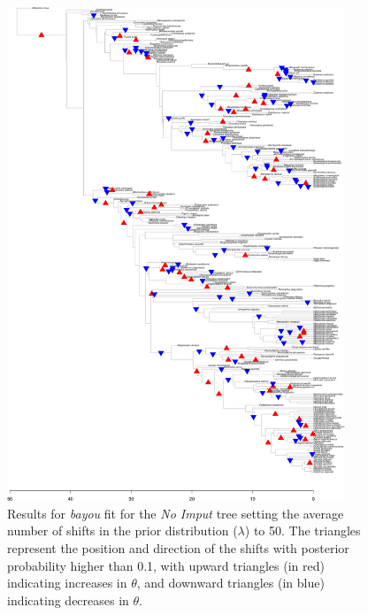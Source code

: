 \begin{figure}[H]
\includegraphics[width=0.9\textwidth]{img/plots-noimput-wZBL-k50-1.pdf}
\caption{Results for \textit{bayou} fit for the \textit{No Imput} tree setting the average number of shifts in the prior distribution ($\lambda$) to 50. The triangles represent the position and direction of the shifts with posterior probability higher than 0.1, with upward triangles (in red) indicating increases in $\theta$, and downward triangles (in blue) indicating decreases in $\theta$.}
\label{fig:noimput-k50}
\end{figure}

\newpage

